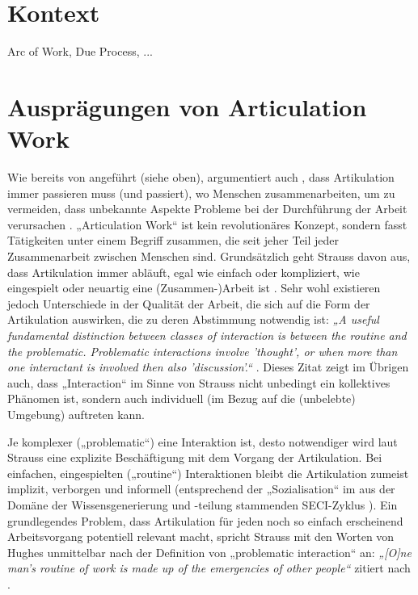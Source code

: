 \section{Kontext} %
\label{sec:kontext}
Arc of Work, Due Process, ...

\section{Ausprägungen von Articulation Work} %
\label{sec:arten_von_articulation_work}

Wie bereits von \citet{Gerson86} angeführt (siehe oben), argumentiert auch \citeauthor{Strauss88}, dass Artikulation immer passieren muss (und passiert), wo Menschen zusammenarbeiten, um zu vermeiden, dass unbekannte Aspekte Probleme bei der Durchführung der Arbeit verursachen \citep{Strauss88}. „Articulation Work“ ist kein revolutionäres Konzept, sondern fasst Tätigkeiten unter einem Begriff zusammen, die seit jeher Teil jeder Zusammenarbeit zwischen Menschen sind. Grundsätzlich geht Strauss davon aus, dass Artikulation immer abläuft, egal wie einfach oder kompliziert, wie eingespielt oder neuartig eine (Zusammen-)Arbeit ist \citep{Strauss88}. Sehr wohl existieren jedoch Unterschiede in der Qualität der Arbeit, die sich auf die Form der Artikulation auswirken, die zu deren Abstimmung notwendig ist: \emph{„A useful fundamental distinction between classes of interaction is between the routine and the problematic. Problematic interactions involve 'thought', or when more than one interactant is involved then also 'discussion'.“} \citep{Strauss93}. Dieses Zitat zeigt im Übrigen auch, dass „Interaction“ im Sinne von Strauss nicht unbedingt ein kollektives Phänomen ist, sondern auch individuell (im Bezug auf die (unbelebte) Umgebung) auftreten kann.

Je komplexer („problematic“) eine Interaktion ist, desto notwendiger wird laut Strauss eine explizite Beschäftigung mit dem Vorgang der Artikulation. Bei einfachen, eingespielten („routine“) Interaktionen bleibt die Artikulation zumeist implizit, verborgen und informell \citep{Hampson05} (entsprechend der „Sozialisation“ im aus der Domäne der Wissensgenerierung und -teilung stammenden SECI-Zyklus \citep{Nonaka95}). Ein grundlegendes Problem, dass Artikulation für jeden noch so einfach erscheinend Arbeitsvorgang potentiell relevant macht, spricht Strauss mit den Worten von Hughes unmittelbar nach der Definition von „problematic interaction“ an: \emph{„[O]ne man's routine of work is made up of the emergencies of other people“} \citep{Hughes71} zitiert nach \citep{Strauss93}.

